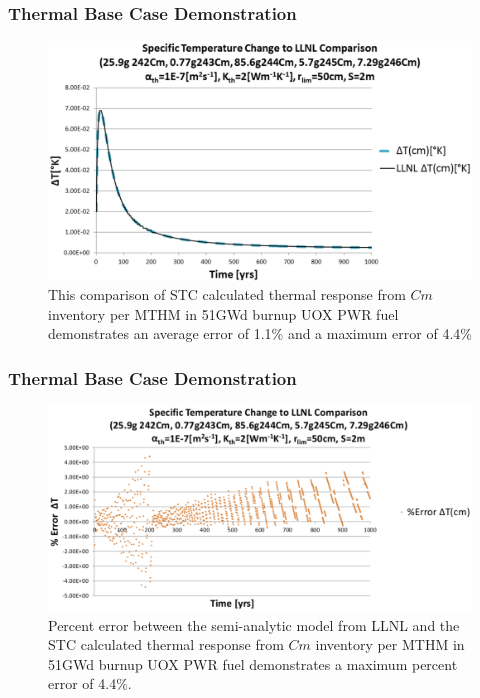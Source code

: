 
\begin{frame}[ctb!]
  \frametitle{Thermal Base Case Demonstration}
  \footnotesize{
\begin{figure}[htp!]
\begin{center}
\includegraphics[width=\columnwidth]{./thermal_demonstration/CmValidation.eps}
\end{center}
\caption{This comparison of STC calculated thermal response from $Cm$ 
inventory per MTHM in 51GWd burnup UOX PWR fuel 
demonstrates an average error of 1.1\% and a 
maximum error of 4.4\%}
\label{fig:CmValidation}
\end{figure}
  }
\end{frame}


\begin{frame}[ctb!]
  \frametitle{Thermal Base Case Demonstration}
\begin{figure}[htp!]
\begin{center}
\includegraphics[width=\columnwidth]{./thermal_demonstration/CmPercentError.eps}
\end{center}
\caption{Percent error between the semi-analytic model from LLNL and the STC 
calculated thermal response from $Cm$ inventory per MTHM in 51GWd burnup UOX 
PWR fuel demonstrates a maximum percent error of 4.4\%.}
\label{fig:CmPercentError}
\end{figure}
\end{frame}

